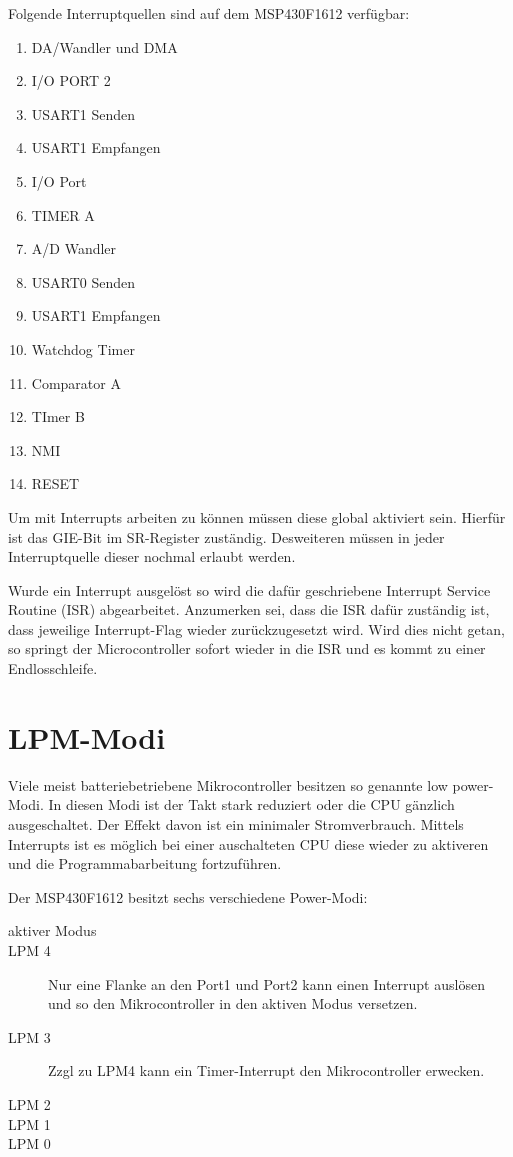 \documentclass[11pt,german]{scrartcl}
\begin{document}
Folgende Interruptquellen sind auf dem MSP430F1612 verfügbar:
\begin{enumerate}
    \item DA/Wandler und DMA
    \item I/O PORT 2
    \item USART1 Senden
    \item USART1 Empfangen
    \item I/O Port 
    \item TIMER A
    \item A/D Wandler   
    \item USART0 Senden
    \item USART1 Empfangen
    \item Watchdog Timer
    \item Comparator A
    \item TImer B
    \item NMI
    \item RESET
\end{enumerate}

Um mit Interrupts arbeiten zu können müssen diese global aktiviert sein.
Hierfür ist das GIE-Bit im SR-Register zuständig.
Desweiteren müssen in jeder Interruptquelle dieser nochmal erlaubt werden.

Wurde ein Interrupt ausgelöst so wird die dafür geschriebene Interrupt Service Routine (ISR) abgearbeitet. Anzumerken sei, dass die ISR dafür zuständig ist, dass jeweilige Interrupt-Flag wieder zurückzugesetzt wird.
Wird dies nicht getan, so springt der Microcontroller sofort wieder in die ISR und es kommt zu einer Endlosschleife.





\clearpage
\section*{LPM-Modi}
Viele meist batteriebetriebene Mikrocontroller besitzen so genannte low power-Modi.
In diesen Modi ist der Takt stark reduziert oder die CPU gänzlich ausgeschaltet. Der Effekt davon ist ein minimaler Stromverbrauch.
Mittels Interrupts ist es möglich bei einer auschalteten CPU diese wieder zu aktiveren und die Programmabarbeitung fortzuführen.

Der MSP430F1612 besitzt sechs verschiedene Power-Modi:
\begin{description}
    \item [aktiver Modus]
    \item [LPM 4]  Nur eine Flanke an den Port1 und Port2 kann einen Interrupt auslösen und so den Mikrocontroller in den aktiven Modus versetzen.
    \item [LPM 3] Zzgl zu LPM4 kann ein Timer-Interrupt den Mikrocontroller erwecken. 
    \item [LPM 2]  
    \item [LPM 1] 
    \item [LPM 0] 
\end{description}



\end{document}
